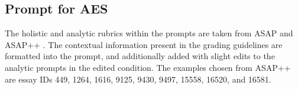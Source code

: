 

\subsection{Prompt for AES}
\label{sec:aes_prompt_appendix}
The holistic and analytic rubrics within the prompts are taken from ASAP \citep{asap-aes} and ASAP++ \citep{mathias-bhattacharyya-2018-asap}. The contextual information present in the grading guidelines are formatted into the prompt, and additionally added with slight edits to the analytic prompts in the edited condition. The examples chosen from ASAP++ are essay IDs 449, 1264, 1616, 9125, 9430, 9497, 15558, 16520, and 16581.

